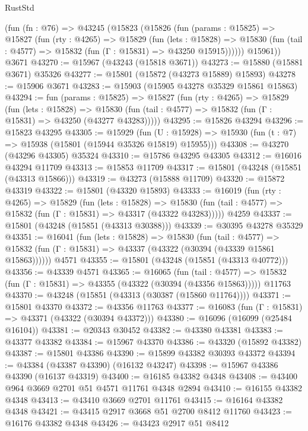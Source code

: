 \begin{lexlean}{RustStd}
\begin{coremodule}
    (fun (fn : @76) =>
    @43245
      (@15823
        (@15826
          (fun (params : @15825) =>
          @15827
            (fun (rty : @4265) =>
            @15829
              (fun (lets : @15828) =>
              @15830 (fun (tail : @4577) => @15832 (fun (Γ : @15831) => @43250 @15915))))))
        @15961))
    @3671
@43270 := @15967 (@43243 (@15818 @3671))
@43273 := @15880 (@15881 @3671) @35326
@43277 := @15801 (@15872 (@43273 @15889) @15893)
@43278 := @15906 @3671
@43283 := @15903 (@15905 @43278 @35329 @15861 @15863)
@43294 := fun (params : @15825) =>
  @15827
    (fun (rty : @4265) =>
    @15829
      (fun (lets : @15828) =>
      @15830 (fun (tail : @4577) => @15832 (fun (Γ : @15831) => @43250 (@43277 @43283)))))
@43295 := @15826 @43294
@43296 := @15823 @43295
@43305 := @15929
    (fun (U : @15928) => @15930 (fun (t : @7) => @15938 (@15801 (@15944 @35326 @15819) @15955)))
@43308 := @43270 (@43296 @43305) @35324
@43310 := @15786 @43295 @43305
@43312 := @16016 @43294 @11709
@43313 := @15853 @11709
@43317 := @15801 (@43248 (@15851 (@43313 @15866)))
@43319 := @43273 (@15888 @11709)
@43320 := @15872 @43319
@43322 := @15801 (@43320 @15893)
@43333 := @16019
    (fun (rty : @4265) =>
    @15829
      (fun (lets : @15828) =>
      @15830 (fun (tail : @4577) => @15832 (fun (Γ : @15831) => @43317 (@43322 @43283)))))
    @4259
@43337 := @15801 (@43248 (@15851 (@43313 @30388)))
@43339 := @30395 @43278 @35329
@43351 := @16041
    (fun (lets : @15828) =>
    @15830
      (fun (tail : @4577) =>
      @15832 (fun (Γ : @15831) => @43337 (@43322 (@30394 (@43339 @15861 @15863))))))
    @4571
@43355 := @15801 (@43248 (@15851 (@43313 @40772)))
@43356 := @43339 @4571
@43365 := @16065
    (fun (tail : @4577) => @15832 (fun (Γ : @15831) => @43355 (@43322 (@30394 (@43356 @15863)))))
    @11763
@43370 := @43248 (@15851 (@43313 (@30387 (@15860 @11764))))
@43371 := @15801 @43370
@43372 := @43356 @11763
@43377 := @16083 (fun (Γ : @15831) => @43371 (@43322 (@30394 @43372)))
@43380 := @16096 (@16099 (@25484 @16104))
@43381 := @20343 @30452
@43382 := @43380 @43381
@43383 := @43377 @43382
@43384 := @15967 @43370
@43386 := @43320 (@15892 @43382)
@43387 := @15801 @43386
@43390 := @15899 @43382 @30393 @43372
@43394 := @43384 (@43387 @43390) (@16132 @43247)
@43398 := @15967 @43386 @43390 (@16137 @43319)
@43400 := @16185 @43382 @4348
@43408 := @43400 @964 @3669 @2701 @51 @4571 @11761 @4348 @2894
@43410 := @16155 @43382 @4348
@43413 := @43410 @3669 @2701 @11761
@43415 := @16164 @43382 @4348
@43421 := @43415 @2917 @3668 @51 @2700 @8412 @11760
@43423 := @16176 @43382 @4348
@43426 := @43423 @2917 @51 @8412

\end{coremodule}
\end{lexlean}
